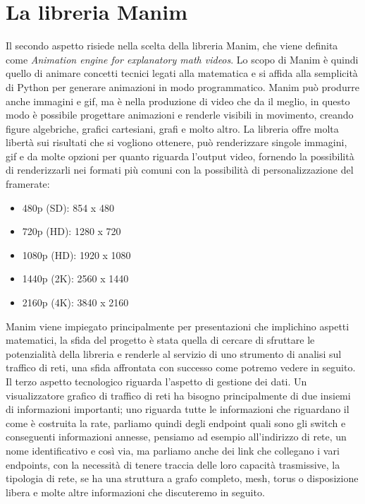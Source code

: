 \documentclass[binding=0.6cm]{sapthesis}
\begin{document}
\section{La libreria Manim}
Il secondo aspetto risiede nella scelta della libreria Manim\cite{Manim}, che viene definita come \textit{Animation engine for explanatory math videos}. Lo scopo di Manim è quindi
quello di animare concetti tecnici legati alla matematica e si affida alla semplicità di Python per generare animazioni in modo programmatico. Manim può produrre anche immagini e gif, ma è nella produzione di video che da il meglio, in questo modo
è possibile progettare animazioni e renderle visibili in movimento, creando figure algebriche, grafici cartesiani, grafi e molto altro\cite{Manim}. 
La libreria offre molta libertà sui risultati che si vogliono ottenere, può renderizzare singole immagini, gif e da molte opzioni per quanto riguarda l'output video, fornendo la possibilità
di renderizzarli nei formati più comuni con la possibilità di personalizzazione del framerate:
\begin{itemize}	
    \item 480p (SD): 854 x 480
    \item 720p (HD): 1280 x 720
    \item 1080p (HD): 1920 x 1080
    \item 1440p (2K): 2560 x 1440
    \item 2160p (4K): 3840 x 2160
\end{itemize}
Manim viene impiegato principalmente per presentazioni che implichino aspetti matematici, la sfida del progetto è stata quella di 
cercare di sfruttare le potenzialità della libreria e renderle al servizio di uno strumento di analisi sul traffico di reti, una sfida affrontata con successo come potremo vedere in seguito.
Il terzo aspetto tecnologico riguarda l'aspetto di gestione dei dati. Un visualizzatore grafico di traffico di reti ha bisogno principalmente di due insiemi di informazioni importanti; uno riguarda tutte le informazioni
che riguardano il come è costruita la rate, parliamo quindi degli endpoint quali sono gli switch e conseguenti informazioni annesse, pensiamo ad esempio all'indirizzo di rete, un nome identificativo e così via, ma parliamo anche dei link che collegano
i vari endpoints, con la necessità di tenere traccia delle loro capacità trasmissive, la tipologia di rete, se ha una struttura a grafo completo, mesh, torus o disposizione libera e molte altre informazioni che discuteremo in seguito.
\end{document}
